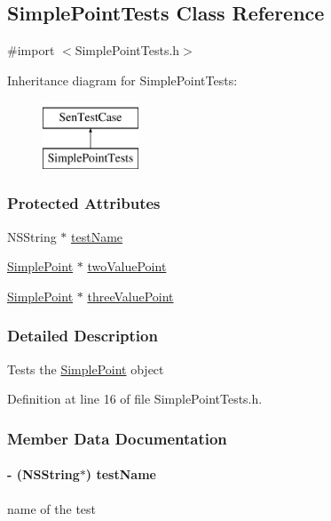 \hypertarget{interface_simple_point_tests}{\subsection{Simple\-Point\-Tests Class Reference}
\label{df/dbc/interface_simple_point_tests}
}


{\ttfamily \#import $<$Simple\-Point\-Tests.\-h$>$}

Inheritance diagram for Simple\-Point\-Tests\-:\begin{figure}[H]
\begin{center}
\leavevmode
\includegraphics[height=2.000000cm]{df/dbc/interface_simple_point_tests}
\end{center}
\end{figure}
\subsubsection*{Protected Attributes}
\begin{DoxyCompactItemize}
\item 
N\-S\-String $\ast$ \hyperlink{interface_simple_point_tests_a649cb8fc74d522648b3d242a79d67c52}{test\-Name}
\item 
\hyperlink{interface_simple_point}{Simple\-Point} $\ast$ \hyperlink{interface_simple_point_tests_a7de54d867fc86e46d98627fd689508f6}{two\-Value\-Point}
\item 
\hyperlink{interface_simple_point}{Simple\-Point} $\ast$ \hyperlink{interface_simple_point_tests_a3eaccf68ce0b22a31daba1edb2e70762}{three\-Value\-Point}
\end{DoxyCompactItemize}


\subsubsection{Detailed Description}
Tests the \hyperlink{interface_simple_point}{Simple\-Point} object 

Definition at line 16 of file Simple\-Point\-Tests.\-h.



\subsubsection{Member Data Documentation}
\hypertarget{interface_simple_point_tests_a649cb8fc74d522648b3d242a79d67c52}{
\paragraph[{test\-Name}]{\setlength{\rightskip}{0pt plus 5cm}-\/ (N\-S\-String$\ast$) test\-Name\hspace{0.3cm}{\ttfamily [protected]}}}\label{df/dbc/interface_simple_point_tests_a649cb8fc74d522648b3d242a79d67c52}
name of the test 

